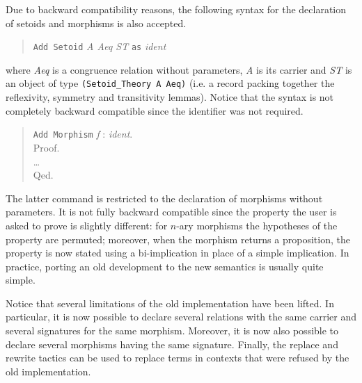 Due to backward compatibility reasons, the following syntax for the
declaration of setoids and morphisms is also accepted.

\begin{quote}
  \texttt{Add Setoid} \textit{A Aeq ST} \texttt{as} \textit{ident}
\end{quote}
where \textit{Aeq} is a congruence relation without parameters,
\textit{A} is its carrier and \textit{ST} is an object of type
\verb|(Setoid_Theory A Aeq)| (i.e. a record packing together the reflexivity,
symmetry and transitivity lemmas). Notice that the syntax is not completely
backward compatible since the identifier was not required.

\begin{quote}
  \texttt{Add Morphism} \textit{ f }:\textit{ ident}.\\
  Proof.\\
  \ldots\\
  Qed.
\end{quote}

The latter command is restricted to the declaration of morphisms without
parameters. It is not fully backward compatible since the property the user
is asked to prove is slightly different: for $n$-ary morphisms the hypotheses
of the property are permuted; moreover, when the morphism returns a
proposition, the property is now stated using a bi-implication in place of
a simple implication. In practice, porting an old development to the new
semantics is usually quite simple.

Notice that several limitations of the old implementation have been lifted.
In particular, it is now possible to declare several relations with the
same carrier and several signatures for the same morphism. Moreover, it is
now also possible to declare several morphisms having the same signature.
Finally, the replace and rewrite tactics can be used to replace terms in
contexts that were refused by the old implementation.

